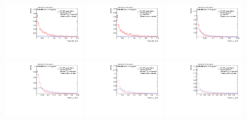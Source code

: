 \begin{figure}[H]
\includegraphics[width=0.3\textwidth]{sascha_input/Appendix/Distributions/w/distributions/beta3/h_normal_tj_D2_3_bin5.pdf} \hspace{1mm}
\includegraphics[width=0.3\textwidth]{sascha_input/Appendix/Distributions/w/distributions/beta3/h_normal_tj_D2_3_bin6.pdf}
\bigskip
\includegraphics[width=0.3\textwidth]{sascha_input/Appendix/Distributions/w/distributions/beta3/h_normal_tj_nSub21_3_bin1.pdf} \hspace{1mm}
\includegraphics[width=0.3\textwidth]{sascha_input/Appendix/Distributions/w/distributions/beta3/h_normal_tj_nSub21_3_bin2.pdf} \hspace{1mm}
\includegraphics[width=0.3\textwidth]{sascha_input/Appendix/Distributions/w/distributions/beta3/h_normal_tj_nSub21_3_bin3.pdf} 
\bigskip
\includegraphics[width=0.3\textwidth]{sascha_input/Appendix/Distributions/w/distributions/beta3/h_normal_tj_nSub21_3_bin4.pdf} \hspace{6mm}

\end{figure}
